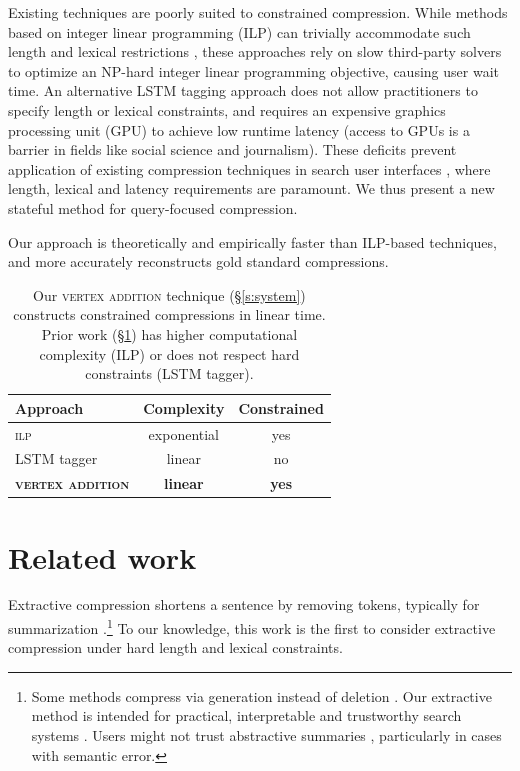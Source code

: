 \documentclass[11pt,a4paper]{article}
\begin{document}
Existing techniques are poorly suited to constrained compression. While methods based on integer linear programming (ILP) can trivially accommodate such length and lexical restrictions \cite{clarke2008global,filippova2013overcoming,Wang2017CanSH}, these approaches rely on slow third-party solvers to optimize an NP-hard integer linear programming objective, causing user wait time. An alternative LSTM tagging approach \cite{filippova2015sentence} does not allow practitioners to specify length or lexical constraints, and requires an expensive graphics processing unit (GPU) to achieve low runtime latency (access to GPUs is a barrier in fields like social science and journalism). These deficits prevent application of existing compression techniques in search user interfaces \cite{marchionini2006exploratory,hearst2009search}, where length, lexical and latency requirements are paramount. We thus present a new stateful method for query-focused compression.

Our approach is theoretically and empirically faster than ILP-based techniques, and more accurately reconstructs gold standard compressions.


\begin{table}[htb!]
\begin{tabular}{lcc}
Approach & Complexity & Constrained  \\ \hline
\textsc{ilp}       &   exponential    & yes     \\
LSTM tagger & linear              & no         \\   
\textbf{\textsc{vertex addition}} & \textbf{linear}     &      \textbf{yes}   
\end{tabular}
\caption{Our \textsc{vertex addition} technique (\S\ref{s:system}) constructs constrained compressions in linear time. Prior work (\S\ref{s:relatedwork}) has higher computational complexity (\textsc{ILP}) or does not respect hard constraints (LSTM tagger).} 
\label{t:algos}
\end{table}

\section{Related work}\label{s:relatedwork}

Extractive compression shortens a sentence by removing tokens, typically for summarization \cite{Knight2000StatisticsBasedS,clarke2008global,filippova2015sentence,Wang2017CanSH}.\footnote{Some methods compress via generation instead of deletion \cite{rush2015neural,mallinson18}. Our extractive method is intended for practical, interpretable and trustworthy search systems \cite{Chuang2012InterpretationAT}. Users might not trust abstractive summaries \cite{Zhang:2018:MSG:3290265.3274465}, particularly in cases with semantic error.} To our knowledge, this work is the first to consider extractive compression under hard length and lexical constraints.
\end{document}
